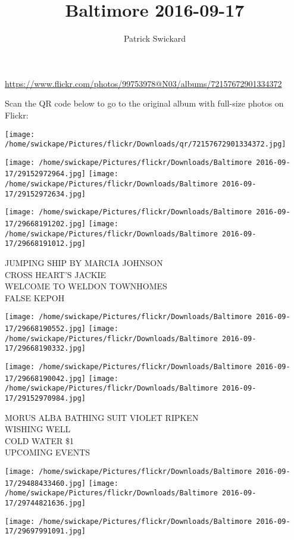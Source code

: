 \documentclass[10pt,letterpaper]{article}
\title{Baltimore 2016-09-17}
\author{Patrick Swickard}
\date{}
\begin{document}
\maketitle

\url{https://www.flickr.com/photos/99753978@N03/albums/72157672901334372}

Scan the QR code below to go to the original album with full-size photos on Flickr:

\texttt{[image: /home/swickape/Pictures/flickr/Downloads/qr/72157672901334372.jpg]}
\pagebreak

\texttt{[image: /home/swickape/Pictures/flickr/Downloads/Baltimore 2016-09-17/29152972964.jpg]}
\texttt{[image: /home/swickape/Pictures/flickr/Downloads/Baltimore 2016-09-17/29152972634.jpg]}

\texttt{[image: /home/swickape/Pictures/flickr/Downloads/Baltimore 2016-09-17/29668191202.jpg]}
\texttt{[image: /home/swickape/Pictures/flickr/Downloads/Baltimore 2016-09-17/29668191012.jpg]}

JUMPING SHIP BY MARCIA JOHNSON\\
CROSS HEART'S JACKIE\\
WELCOME TO WELDON TOWNHOMES\\
FALSE KEPOH
\pagebreak

\texttt{[image: /home/swickape/Pictures/flickr/Downloads/Baltimore 2016-09-17/29668190552.jpg]}
\texttt{[image: /home/swickape/Pictures/flickr/Downloads/Baltimore 2016-09-17/29668190332.jpg]}

\texttt{[image: /home/swickape/Pictures/flickr/Downloads/Baltimore 2016-09-17/29668190042.jpg]}
\texttt{[image: /home/swickape/Pictures/flickr/Downloads/Baltimore 2016-09-17/29152970984.jpg]}

MORUS ALBA BATHING SUIT VIOLET RIPKEN\\
WISHING WELL\\
COLD WATER \$1\\
UPCOMING EVENTS
\pagebreak

\texttt{[image: /home/swickape/Pictures/flickr/Downloads/Baltimore 2016-09-17/29488433460.jpg]}
\texttt{[image: /home/swickape/Pictures/flickr/Downloads/Baltimore 2016-09-17/29744821636.jpg]}

\texttt{[image: /home/swickape/Pictures/flickr/Downloads/Baltimore 2016-09-17/29697991091.jpg]}
\end{document}
